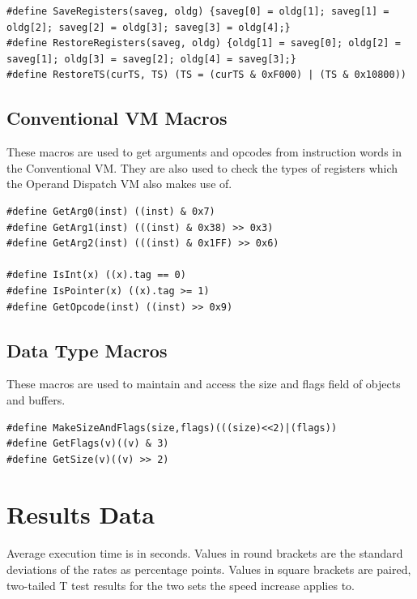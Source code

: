 \documentclass[english,a4paper,12pt]{report}
\begin{document}
\begin{lstlisting}
#define SaveRegisters(saveg, oldg) {saveg[0] = oldg[1]; saveg[1] = oldg[2]; saveg[2] = oldg[3]; saveg[3] = oldg[4];}
#define RestoreRegisters(saveg, oldg) {oldg[1] = saveg[0]; oldg[2] = saveg[1]; oldg[3] = saveg[2]; oldg[4] = saveg[3];}
#define RestoreTS(curTS, TS) (TS = (curTS & 0xF000) | (TS & 0x10800))
\end{lstlisting}

\section{Conventional VM Macros}
\label{sec:convmacros}

These macros are used to get arguments and opcodes from instruction
words in the Conventional VM. They are also used to check the types of
registers which the Operand Dispatch VM also makes use of.

\begin{lstlisting}
#define GetArg0(inst) ((inst) & 0x7) 
#define GetArg1(inst) (((inst) & 0x38) >> 0x3)
#define GetArg2(inst) (((inst) & 0x1FF) >> 0x6) 

#define IsInt(x) ((x).tag == 0)
#define IsPointer(x) ((x).tag >= 1)
#define GetOpcode(inst) ((inst) >> 0x9)
\end{lstlisting}

\section{Data Type Macros}
\label{sec:datamacros}
These macros are used to maintain and access the size and flags field
of objects and buffers.

\begin{lstlisting}
#define MakeSizeAndFlags(size,flags)(((size)<<2)|(flags))
#define GetFlags(v)((v) & 3)
#define GetSize(v)((v) >> 2)
\end{lstlisting}

\chapter{Results Data}

Average execution time is in seconds. Values in round brackets are the
standard deviations of the rates as percentage points. Values in
square brackets are paired, two-tailed T test results for the two sets
the speed increase applies to.
\end{document}
